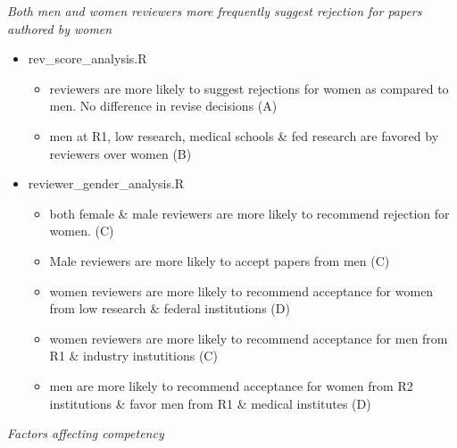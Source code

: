 \documentclass[11pt,]{article}
\providecommand{\tightlist}{%
  \setlength{\itemsep}{0pt}\setlength{\parskip}{0pt}}
\begin{document}
\emph{Both men and women reviewers more frequently suggest rejection for
papers authored by women}

\begin{itemize}
\tightlist
\item
  rev\_score\_analysis.R

  \begin{itemize}
  \tightlist
  \item
    reviewers are more likely to suggest rejections for women as
    compared to men. No difference in revise decisions (A)
  \item
    men at R1, low research, medical schools \& fed research are favored
    by reviewers over women (B)
  \end{itemize}
\item
  reviewer\_gender\_analysis.R

  \begin{itemize}
  \tightlist
  \item
    both female \& male reviewers are more likely to recommend rejection
    for women. (C)
  \item
    Male reviewers are more likely to accept papers from men (C)
  \item
    women reviewers are more likely to recommend acceptance for women
    from low research \& federal institutions (D)
  \item
    women reviewers are more likely to recommend acceptance for men from
    R1 \& industry instutitions (C)
  \item
    men are more likely to recommend acceptance for women from R2
    institutions \& favor men from R1 \& medical institutes (D)
  \end{itemize}
\end{itemize}

\emph{Factors affecting competency}
\end{document}
